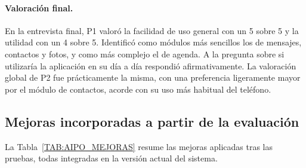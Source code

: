 \paragraph{Valoración final.}
En la entrevista final, P1 valoró la facilidad de uso general con un 5
sobre 5 y la utilidad con un 4 sobre 5. Identificó como módulos más
sencillos los de mensajes, contactos y fotos, y como más complejo el de
agenda. A la pregunta sobre si utilizaría la aplicación en su día a día
respondió afirmativamente. La valoración global de P2 fue prácticamente la
misma, con una preferencia ligeramente mayor por el módulo de contactos,
acorde con su uso más habitual del teléfono.

\subsection{Mejoras incorporadas a partir de la
evaluación\label{SUB:AIPO_MEJORAS}}

La Tabla~\ref{TAB:AIPO_MEJORAS} resume las mejoras aplicadas tras las
pruebas, todas integradas en la versión actual del sistema.


